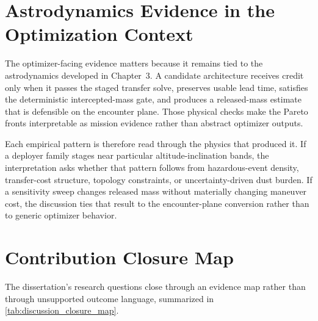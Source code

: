 \section{Astrodynamics Evidence in the Optimization Context} \label{se:discussion_astro_context}

The optimizer-facing evidence matters because it remains tied to the astrodynamics developed in Chapter~3. A candidate architecture receives credit only when it passes the staged transfer solve, preserves usable lead time, satisfies the deterministic intercepted-mass gate, and produces a released-mass estimate that is defensible on the encounter plane. Those physical checks make the Pareto fronts interpretable as mission evidence rather than abstract optimizer outputs.

Each empirical pattern is therefore read through the physics that produced it. If a deployer family stages near particular altitude-inclination bands, the interpretation asks whether that pattern follows from hazardous-event density, transfer-cost structure, topology constraints, or uncertainty-driven dust burden. If a sensitivity sweep changes released mass without materially changing maneuver cost, the discussion ties that result to the encounter-plane conversion rather than to generic optimizer behavior.

\section{Contribution Closure Map} \label{se:discussion_contributions}

The dissertation's research questions close through an evidence map rather than through unsupported outcome language, summarized in \cref{tab:discussion_closure_map}.


